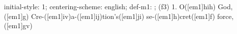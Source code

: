 initial-style: 1;
centering-scheme: english;
def-m1: \grealign;
(f3) 1. O([em1]hih) God,([em1]g) Cre-([em1]iv)a-([em1]ij)tion's([em1]ji) se-([em1]h)cret([em1]f) force,([em1]gv)